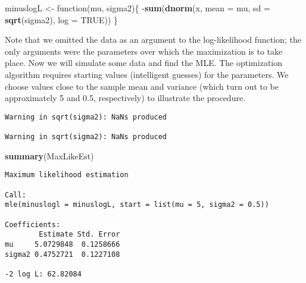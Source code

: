 \documentclass[]{book}
\newenvironment{Shaded}{\begin{snugshade}}{\end{snugshade}}
\newcommand{\KeywordTok}[1]{\textcolor[rgb]{0.13,0.29,0.53}{\textbf{{#1}}}}
\newcommand{\DataTypeTok}[1]{\textcolor[rgb]{0.13,0.29,0.53}{{#1}}}
\newcommand{\DecValTok}[1]{\textcolor[rgb]{0.00,0.00,0.81}{{#1}}}
\newcommand{\FloatTok}[1]{\textcolor[rgb]{0.00,0.00,0.81}{{#1}}}
\newcommand{\StringTok}[1]{\textcolor[rgb]{0.31,0.60,0.02}{{#1}}}
\newcommand{\OtherTok}[1]{\textcolor[rgb]{0.56,0.35,0.01}{{#1}}}
\newcommand{\NormalTok}[1]{{#1}}
\numberwithin{equation}{chapter}
\numberwithin{figure}{chapter}
\theoremstyle{plain}
\theoremstyle{definition}
\theoremstyle{remark}
\theoremstyle{definition}
\theoremstyle{definition}
\theoremstyle{remark}
\begin{document}
\begin{Shaded}
\begin{Highlighting}[]
\NormalTok{minuslogL <-}\StringTok{ }\NormalTok{function(mu, sigma2)\{}
  \NormalTok{-}\KeywordTok{sum}\NormalTok{(}\KeywordTok{dnorm}\NormalTok{(x, }\DataTypeTok{mean =} \NormalTok{mu, }\DataTypeTok{sd =} \KeywordTok{sqrt}\NormalTok{(sigma2), }\DataTypeTok{log =} \OtherTok{TRUE}\NormalTok{))}
\NormalTok{\}}
\end{Highlighting}
\end{Shaded}

Note that we omitted the data as an argument to the log-likelihood
function; the only arguments were the parameters over which the
maximization is to take place. Now we will simulate some data and find
the MLE. The optimization algorithm requires starting values
(intelligent guesses) for the parameters. We choose values close to the
sample mean and variance (which turn out to be approximately 5 and 0.5,
respectively) to illustrate the procedure.

\begin{Shaded}
\end{Shaded}

\begin{verbatim}
Warning in sqrt(sigma2): NaNs produced

Warning in sqrt(sigma2): NaNs produced
\end{verbatim}

\begin{Shaded}
\begin{Highlighting}[]
\KeywordTok{summary}\NormalTok{(MaxLikeEst)}
\end{Highlighting}
\end{Shaded}

\begin{verbatim}
Maximum likelihood estimation

Call:
mle(minuslogl = minuslogL, start = list(mu = 5, sigma2 = 0.5))

Coefficients:
        Estimate Std. Error
mu     5.0729848  0.1258666
sigma2 0.4752721  0.1227108

-2 log L: 62.82084 
\end{verbatim}
\end{document}
